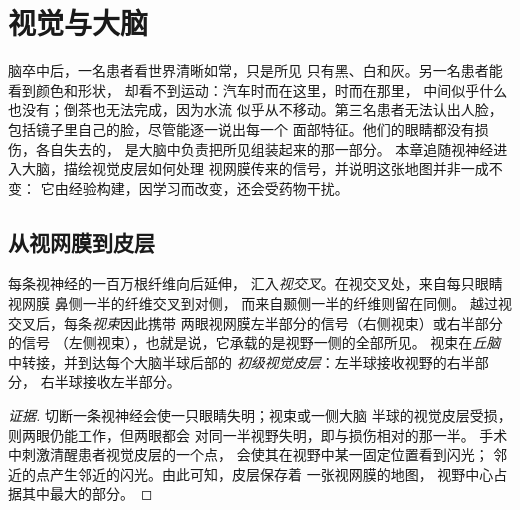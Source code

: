 \chapter{视觉与大脑}\label{ch:g11:vision-and-brain}

脑卒中后，一名患者看世界清晰如常，只是所见
只有黑、白和灰。另一名患者能看到颜色和形状，
却看不到运动：汽车时而在这里，时而在那里，
中间似乎什么也没有；倒茶也无法完成，因为水流
似乎从不移动。第三名患者无法认出人脸，
包括镜子里自己的脸，尽管能逐一说出每一个
面部特征。他们的眼睛都没有损伤，各自失去的，
是大脑中负责把所见组装起来的那一部分。
本章追随视神经进入大脑，描绘视觉皮层如何处理
视网膜传来的信号，并说明这张地图并非一成不变：
它由经验构建，因学习而改变，还会受药物干扰。

\section{从视网膜到皮层}

\begin{proposition}[视觉通路]\label{prop:g11:vision-and-brain:pathway}
每条视神经的一百万根纤维向后延伸，
汇入\emph{视交叉}。在视交叉处，来自每只眼睛视网膜
鼻侧一半的纤维交叉到对侧，
而来自颞侧一半的纤维则留在同侧。
越过视交叉后，每条\emph{视束}因此携带
两眼视网膜左半部分的信号（右侧视束）或右半部分的信号
（左侧视束），也就是说，它承载的是视野一侧的全部所见。
视束在\emph{丘脑}中转接，并到达每个大脑半球后部的
\emph{初级视觉皮层}：左半球接收视野的右半部分，
右半球接收左半部分。
\end{proposition}
\begin{proof}[证据]
切断一条视神经会使一只眼睛失明；视束或一侧大脑
半球的视觉皮层受损，则两眼仍能工作，但两眼都会
对同一半视野失明，即与损伤相对的那一半。
手术中刺激清醒患者视觉皮层的一个点，
会使其在视野中某一固定位置看到闪光；
邻近的点产生邻近的闪光。由此可知，皮层保存着
一张视网膜的地图，
视野中心占据其中最大的部分。
\end{proof}

